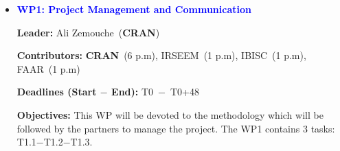 \documentclass[a4paper,11pt]{article}
\begin{document}
\smallskip
\begin{itemize}[leftmargin=.2in,noitemsep,nolistsep]
\item \textcolor{blue}{\bf WP1: Project Management and Communication}\\
\vspace{-0.4cm}
\begin{tcolorbox}[breakable, enhanced,  colback=blue!2!white,
title = \bf Contributors$-$Deadlines$-$Objectives, coltitle= black, colbacktitle=orange!60!white, halign title=center]

{ \bf {Leader}:} Ali {\sc Zemouche}~({\bf CRAN})

{ \bf {Contributors}:} {\bf CRAN}~(\textcolor{navyblue}{6 p.m}), IRSEEM~(\textcolor{navyblue}{1 p.m}), IBISC~(\textcolor{navyblue}{1 p.m}), FAAR~(\textcolor{navyblue}{1 p.m})

{ \bf {Deadlines (Start $-$ End)}:} T0~$-$~T0+48

{ \bf {Objectives}:} This WP will be devoted to the methodology which will be followed by the partners to manage the project. The WP1 contains 3 tasks: T1.1$-$T1.2$-$T1.3.

\end{tcolorbox}

\end{itemize}
\end{document}
